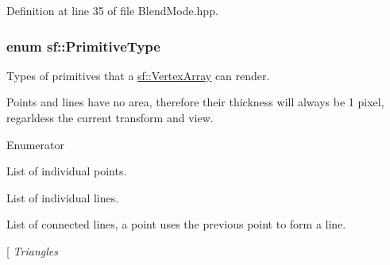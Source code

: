 Definition at line 35 of file Blend\-Mode.\-hpp.

\hypertarget{group__graphics_ga5ee56ac1339984909610713096283b1b}{
\subsubsection[{Primitive\-Type}]{\setlength{\rightskip}{0pt plus 5cm}enum {\bf sf\-::\-Primitive\-Type}}}\label{group__graphics_ga5ee56ac1339984909610713096283b1b}


Types of primitives that a \hyperlink{classsf_1_1VertexArray}{sf\-::\-Vertex\-Array} can render. 

Points and lines have no area, therefore their thickness will always be 1 pixel, regarldess the current transform and view. \begin{Desc}
\item[Enumerator]\par
\begin{description}
\item[{\em 
\hypertarget{group__graphics_gga5ee56ac1339984909610713096283b1bac7097d3e01778b9318def1f7ac35a785}{Points}\label{group__graphics_gga5ee56ac1339984909610713096283b1bac7097d3e01778b9318def1f7ac35a785}
}]List of individual points. \item[{\em 
\hypertarget{group__graphics_gga5ee56ac1339984909610713096283b1ba2bf015eeff9f798dfc3d6d744d669f1e}{Lines}\label{group__graphics_gga5ee56ac1339984909610713096283b1ba2bf015eeff9f798dfc3d6d744d669f1e}
}]List of individual lines. \item[{\em 
\hypertarget{group__graphics_gga5ee56ac1339984909610713096283b1ba5b09910f5d0f39641342184ccd0d1de3}{Lines\-Strip}\label{group__graphics_gga5ee56ac1339984909610713096283b1ba5b09910f5d0f39641342184ccd0d1de3}
}]List of connected lines, a point uses the previous point to form a line. \item[{\em 
\hypertarget{group__graphics_gga5ee56ac1339984909610713096283b1ba880a7aa72c20b9f9beb7eb64d2434670}{Triangles}\label{group__graphics_gga5ee56ac1339984909610713096283b1ba880a7aa72c20b9f9beb7eb64d2434670}
}
\end{description}
\end{Desc}
